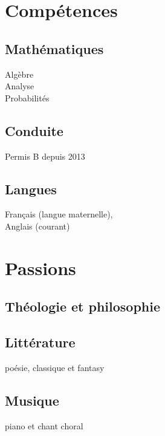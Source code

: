 \documentclass[]{cv-template}
\begin{document}
\begin{minipage}[t]{0.34\textwidth}
\section{Compétences}
\subsection{Mathématiques}
\mycaret Algèbre\\
\mycaret Analyse\\
\mycaret Probabilités\\
\sectionsep

\subsection{Conduite}
Permis B depuis 2013
  
\sectionsep
\subsection{Langues}
\mycaret  Français (langue maternelle), \\
\mycaret  Anglais (courant) \\
\sectionsep



\section{Passions}
\subsection{Théologie et philosophie}
\sectionsep
\subsection{Littérature}
poésie, classique et fantasy\\
\subsection{Musique}
piano et chant choral\\


\end{minipage}
\end{document}
